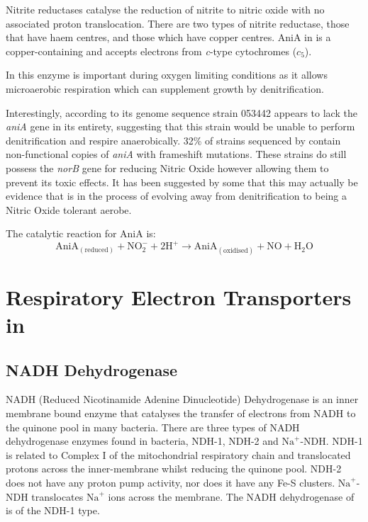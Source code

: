 Nitrite reductases catalyse the reduction of nitrite to nitric oxide with no associated proton translocation. There are two types of nitrite reductase, those that have haem centres, and those which have copper centres. AniA in \Nm{} is a copper-containing and accepts electrons from \textit{c}-type cytochromes ($c_5$).

In \Nm{} this enzyme is important during oxygen limiting conditions as it allows microaerobic respiration which can supplement growth by denitrification\cite{Rock2005}.

Interestingly, according to its genome sequence \Nm{} strain 053442 appears to lack the \textit{aniA} gene in its entirety, suggesting that this strain would be unable to perform denitrification and respire anaerobically\cite{Barth2009}. 32\% of \Nm{} strains sequenced by \citet{Barth2009} contain non-functional copies of \textit{aniA} with frameshift mutations. These strains do still possess the \textit{norB} gene for reducing Nitric Oxide however allowing them to prevent its toxic effects. It has been suggested by some that this may actually be evidence that \Nsm{} is in the process of evolving away from denitrification to being a Nitric Oxide tolerant aerobe\cite{Moir2011}.

The catalytic reaction for AniA is:
\begin{equation}
\mathrm{AniA}_{\mathrm{(reduced)}} + \mathrm{NO}_2^- + 2\mathrm{H}^+ \rightarrow \mathrm{AniA}_{\mathrm{(oxidised)}} + \mathrm{NO} + \mathrm{H}_2\mathrm{O}
\end{equation}

\section{Respiratory Electron Transporters in \Nm{}}
\subsection{NADH Dehydrogenase}
NADH (Reduced Nicotinamide Adenine Dinucleotide) Dehydrogenase is an inner membrane bound enzyme that catalyses the transfer of electrons from NADH to the quinone pool in many bacteria. There are three types of NADH dehydrogenase enzymes found in bacteria, NDH-1, NDH-2 and $\mathrm{Na}^+$-NDH. NDH-1 is related to Complex I of the mitochondrial respiratory chain and translocated protons across the inner-membrane whilst reducing the quinone pool\cite{Weiss1991,Carroll2003,Friedrich2004}. NDH-2 does not have any proton pump activity, nor does it have any Fe-S clusters\cite{Yagi1991}. $\mathrm{Na}^+$-NDH translocates $\mathrm{Na}^+$ ions across the membrane\cite{Gemperli2002}. The NADH dehydrogenase of \Nm{} is of the NDH-1 type\cite{Deeudom2007}.

